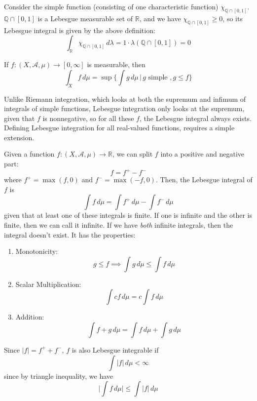\documentclass{article}
\begin{document}
\begin{example}
  Consider the simple function (consisting of one characteristic function) $\chi_{\mathbb{Q} \cap [0, 1]}$. $\mathbb{Q} \cap [0, 1]$ is a Lebesgue measurable set of $\mathbb{R}$, and we have $\chi_{\mathbb{Q} \cap [0, 1]} \geq 0$, so its Lebesgue integral is given by the above definition: 
  \[\int_{\mathbb{R}} \chi_{\mathbb{Q} \cap [0, 1]} \, d\lambda = 1 \cdot \lambda(\mathbb{Q} \cap [0, 1]) = 0\]
\end{example}

\begin{definition}
  If $f: (X, \mathcal{A}, \mu) \longrightarrow [0, \infty]$ is measurable, then 
  \[\int_X f \, d\mu = \sup \Big\{ \int g\, d\mu \,\Big|\, g \text{ simple }, g \leq f\Big\}\]
\end{definition}

Unlike Riemann integration, which looks at both the supremum and infimum of integrals of simple functions, Lebesgue integration only looks at the supremum, given that $f$ is nonnegative, so for all these $f$, the Lebesgue integral always exists. Defining Lebesgue integration for all real-valued functions, requires a simple extension. 

\begin{definition}
  Given a function $f: (X, \mathcal{A}, \mu) \longrightarrow \mathbb{R}$, we can split $f$ into a positive and negative part: 
  \[f = f^+ - f^-\]
  where $f^+ = \max(f, 0)$ and $f^- = \max(-f, 0)$. Then, the Lebesgue integral of $f$ is 
  \[\int f \, d \mu = \int f^+ \, d\mu - \int f^- \, d\mu\]
  given that at least one of these integrals is finite. If one is infinite and the other is finite, then we can call it infinite. If we have \textit{both} infinite integrals, then the integral doesn't exist. It has the properties: 
  \begin{enumerate}
    \item Monotonicity: 
    \[g \leq f \implies \int g \, d\mu \leq \int f\, d\mu\]
    \item Scalar Multiplication: 
    \[\int c f \, d\mu = c \int f \, d\mu\]
    \item Addition:
    \[\int f + g \, d\mu = \int f \,d\mu + \int g \,d\mu\]
  \end{enumerate}
\end{definition}

Since $|f| = f^+ + f^-$, $f$ is also Lebesgue integrable if 
\[\int |f| \, d\mu < \infty \]
since by triangle inequality, we have 
\[\bigg| \int f \, d\mu \bigg| \leq \int |f| \, d \mu\]
\end{document}
